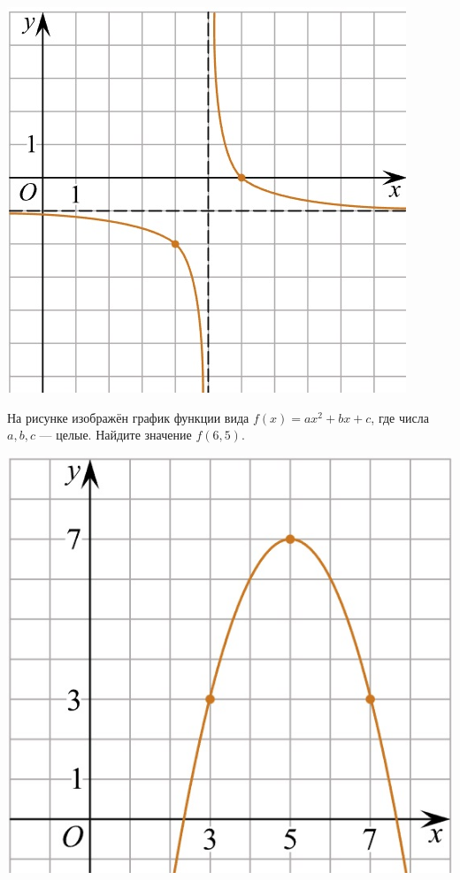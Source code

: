 \begin{class}[number=5]
\begin{listofex}
\begin{minipage}[t]{0.22\textwidth}
			\includegraphics[align=t, width=\textwidth]{pics/G101M4C5-5.jpg}
		\end{minipage}
		\item
		\begin{minipage}[t]{0.66\textwidth}
			На рисунке изображён график функции вида \(f(x)=ax^2+bx+c\), где числа \(a, b, c\) --- целые. Найдите значение \(f(6,5)\).
		\end{minipage}
		\hspace{0.05\textwidth}
		\begin{minipage}[t]{0.22\textwidth}
			\includegraphics[width=\textwidth]{pics/G101M4H2-5.jpg}

\end{minipage}
\end{listofex}
\end{class}
